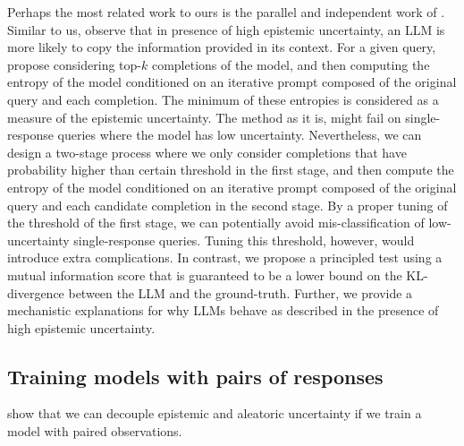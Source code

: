 Perhaps the most related work to ours is the parallel and independent work of \citet{ahdritz2024}. Similar to us, \citet{ahdritz2024} observe that in presence of high epistemic uncertainty, an LLM is more likely to copy the information provided in its context. For a given query, \citet{ahdritz2024} propose considering top-$k$ completions of the model, and then computing the entropy of the model conditioned on an iterative prompt composed of the original query and each completion. The minimum of these entropies is considered as a measure of the epistemic uncertainty. The method as it is, might fail on single-response queries where the model has low uncertainty. 
Nevertheless, we can design a two-stage process where we only consider completions that have probability higher than certain threshold in the first stage, and then compute the entropy of the model conditioned on an iterative prompt composed of the original query and each candidate completion in the second stage. By a proper tuning of the threshold of the first stage, we can potentially avoid mis-classification of low-uncertainty single-response queries. Tuning this threshold, however, would introduce extra complications. In contrast, we propose a principled test using a mutual information score that is guaranteed to be a lower bound on the KL-divergence between the LLM and the ground-truth. Further, we provide a mechanistic explanations for why LLMs behave as described in the presence of high epistemic uncertainty. 


\subsection{Training models with pairs of responses}

\citet{wen2022predictions,osband2023epistemic,johnson2024experts} show that we can decouple epistemic and aleatoric uncertainty if we train a model with paired observations. 

